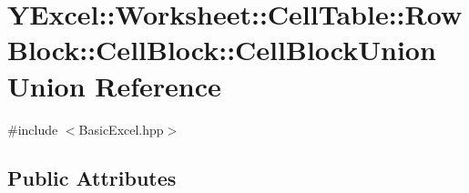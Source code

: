 \hypertarget{union_y_excel_1_1_worksheet_1_1_cell_table_1_1_row_block_1_1_cell_block_1_1_cell_block_union}{}\section{Y\+Excel\+:\+:Worksheet\+:\+:Cell\+Table\+:\+:Row\+Block\+:\+:Cell\+Block\+:\+:Cell\+Block\+Union Union Reference}
\label{union_y_excel_1_1_worksheet_1_1_cell_table_1_1_row_block_1_1_cell_block_1_1_cell_block_union}


{\ttfamily \#include $<$Basic\+Excel.\+hpp$>$}

\subsection*{Public Attributes}

